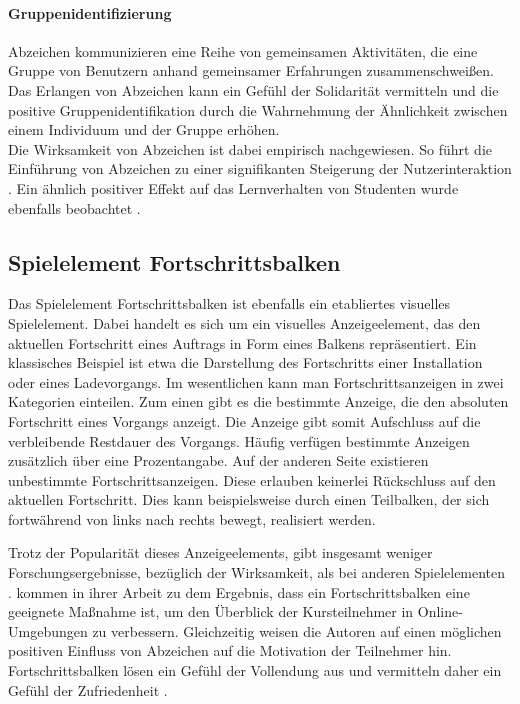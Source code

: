 \paragraph{Gruppenidentifizierung}
Abzeichen kommunizieren eine Reihe von gemeinsamen Aktivitäten, die eine Gruppe von Benutzern anhand gemeinsamer Erfahrungen zusammenschweißen. Das Erlangen von Abzeichen kann ein Gefühl der Solidarität vermitteln und die positive Gruppenidentifikation durch die Wahrnehmung der Ähnlichkeit zwischen einem Individuum und der Gruppe erhöhen.\\

Die Wirksamkeit von Abzeichen ist dabei empirisch nachgewiesen. So führt die Einführung von Abzeichen zu einer signifikanten Steigerung der Nutzerinteraktion \cite{hamari_badges_2017}. Ein ähnlich positiver Effekt auf das Lernverhalten von Studenten wurde ebenfalls beobachtet \cite{hamzah_influence_2015}.

\subsection{Spielelement Fortschrittsbalken}
Das Spielelement Fortschrittsbalken ist ebenfalls ein etabliertes visuelles Spielelement.
Dabei handelt es sich um ein visuelles Anzeigeelement, das den aktuellen Fortschritt eines Auftrags in Form eines Balkens repräsentiert. Ein klassisches Beispiel ist etwa die Darstellung des Fortschritts einer Installation oder eines Ladevorgangs. Im wesentlichen kann man Fortschrittsanzeigen in zwei Kategorien einteilen. Zum einen gibt es die bestimmte Anzeige, die den absoluten Fortschritt eines Vorgangs anzeigt. Die Anzeige gibt somit Aufschluss auf die verbleibende Restdauer des Vorgangs. Häufig verfügen bestimmte Anzeigen zusätzlich über eine Prozentangabe. Auf der anderen Seite existieren unbestimmte Fortschrittsanzeigen. Diese erlauben keinerlei Rückschluss auf den aktuellen Fortschritt. Dies kann beispielsweise durch einen Teilbalken, der sich fortwährend von links nach rechts bewegt, realisiert werden.

Trotz der Popularität dieses Anzeigeelements, gibt insgesamt weniger Forschungsergebnisse, bezüglich der Wirksamkeit, als bei anderen Spielelementen \cite{koivisto_rise_2019}.
 kommen in ihrer Arbeit zu dem Ergebnis, dass ein Fortschrittsbalken eine geeignete Maßnahme ist, um den Überblick der Kursteilnehmer in Online-Umgebungen zu verbessern. Gleichzeitig weisen die Autoren auf einen möglichen positiven Einfluss von Abzeichen auf die Motivation der Teilnehmer hin. Fortschrittsbalken lösen ein Gefühl der Vollendung aus und vermitteln daher ein Gefühl der Zufriedenheit \cite{ryan_deci_2000}.

